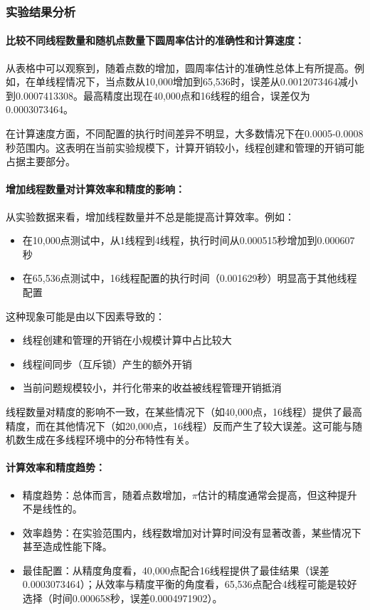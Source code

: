 \documentclass{SYSUReport}
\begin{document}
\subsubsection{实验结果分析}

\paragraph{比较不同线程数量和随机点数量下圆周率估计的准确性和计算速度：}
从表格中可以观察到，随着点数的增加，圆周率估计的准确性总体上有所提高。例如，在单线程情况下，当点数从10,000增加到65,536时，误差从0.0012073464减小到0.0007413308。最高精度出现在40,000点和16线程的组合，误差仅为0.0003073464。

在计算速度方面，不同配置的执行时间差异不明显，大多数情况下在0.0005-0.0008秒范围内。这表明在当前实验规模下，计算开销较小，线程创建和管理的开销可能占据主要部分。

\paragraph{增加线程数量对计算效率和精度的影响：}
从实验数据来看，增加线程数量并不总是能提高计算效率。例如：
\begin{itemize}
    \item 在10,000点测试中，从1线程到4线程，执行时间从0.000515秒增加到0.000607秒
    \item 在65,536点测试中，16线程配置的执行时间（0.001629秒）明显高于其他线程配置
\end{itemize}

这种现象可能是由以下因素导致的：
\begin{itemize}
    \item 线程创建和管理的开销在小规模计算中占比较大
    \item 线程间同步（互斥锁）产生的额外开销
    \item 当前问题规模较小，并行化带来的收益被线程管理开销抵消
\end{itemize}

线程数量对精度的影响不一致，在某些情况下（如40,000点，16线程）提供了最高精度，而在其他情况下（如20,000点，16线程）反而产生了较大误差。这可能与随机数生成在多线程环境中的分布特性有关。

\paragraph{计算效率和精度趋势：}
\begin{itemize}
    \item 精度趋势：总体而言，随着点数增加，$\pi$估计的精度通常会提高，但这种提升不是线性的。
    \item 效率趋势：在实验范围内，线程数增加对计算时间没有显著改善，某些情况下甚至造成性能下降。
    \item 最佳配置：从精度角度看，40,000点配合16线程提供了最佳结果（误差0.0003073464）；从效率与精度平衡的角度看，65,536点配合4线程可能是较好选择（时间0.000658秒，误差0.0004971902）。
\end{itemize}
\end{document}
